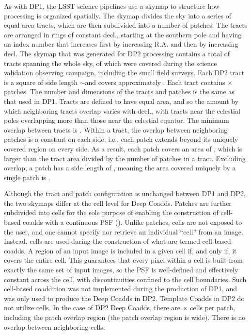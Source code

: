As with \gls{DP1}, the LSST science pipelines use a skymap to structure how processing is organized spatially.
The skymap divides the sky into a series of equal-area tracts, which are then subdivided into a number of patches.
The tracts are arranged in rings of constant decl., starting at the southern pole and having an index number that increases first by increasing R.A. and then by increasing decl.
The skymap that was generated for \gls{DP2} processing contains a total of \ntracts tracts spanning the whole sky, \ncoveredtracts of which were covered during the science validation observing campaign, including the small field surveys.
Each DP2 \gls{tract} is a square of side length $\sim$\tractside and covers approximately \tractarea.
Each tract contains \npatchx $\times$ \npatchy patches.
The number and dimensions of the tracts and patches is the same as that used in \gls{DP1}.
Tracts are defined to have equal area, and so the amount by which neighboring tracts overlap varies with decl., with tracts near the celestial poles overlapping more than those near the celestial equator.
The minimum overlap between tracts is \tractoverlap.
Within a \gls{tract}, the overlap between neighboring patches is a constant \patchoverlap on each side, i.e., each \gls{patch} extends \patchoverlap beyond its uniquely covered region on every side.
As a result, each \gls{patch} covers an area of \patcharea, which is larger than the tract area divided by the number of patches in a tract.
Excluding overlap, a patch has a side length of \patchside, meaning the area covered uniquely by a single \gls{patch} is \patchareanooverlap.

Although the tract and \gls{patch} configuration is unchanged between \gls{DP1} and \gls{DP2}, the two skymaps differ at the cell level for Deep Coadds.
Patches are further subdivided into cells for the sole purpose of enabling the construction of cell-based coadds with a continuous \gls{PSF} ().
Unlike patches, cells are not exposed to the user, and one cannot specify nor retrieve an individual ``cell'' from an image.
Instead, cells are used during the construction of  what are termed cell-based coadds.
A region of an input image is included in a given cell if, and only if, it covers the entire cell.
This guarantees that every pixel within a cell is built from exactly the same set of input images, so the \gls{PSF} is well-defined and effectively constant across the cell, with discontinuities confined to the cell boundaries.
Such cell-based coaddition was not implemented during the production of \gls{DP1}, and was only used to produce the Deep Coadds in DP2.
Template Coadds in \gls{DP2} do not utilize cells.
In the case of DP2 Deep Coadds, there are \ncellx $\times$ \ncelly cells per \gls{patch}, including the \gls{patch} overlap region (the \gls{patch} overlap region is \ncellpatchoverlap wide).
There is no overlap between neighboring cells.

